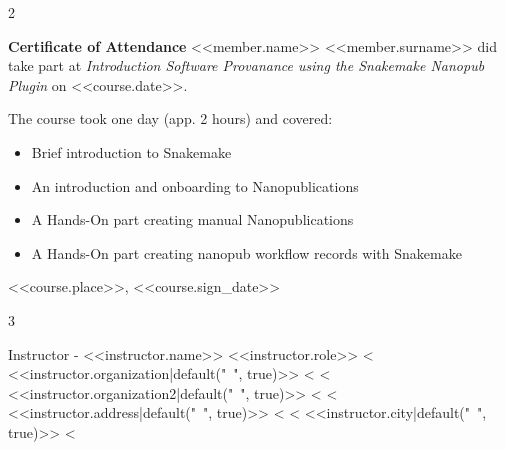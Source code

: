 \documentclass[a4paper,10pt]{article}
\begin{document}
\pagestyle{empty}
\begin{multicols}{2}

 \columnbreak
\end{multicols}


\begin{center}
 \vfill
 \huge{\bf Certificate of Attendance}
 \vfill
 \Large{<<member.name>> <<member.surname>>}
 \vfill
 did take part at 
 \vfill
 \emph{Introduction Software Provanance using the Snakemake Nanopub Plugin}
 \vfill
 on <<course.date>>.
 \vfill
\end{center}

The course took one day (app. 2 hours) and covered:
\begin{itemize}
  \item Brief introduction to Snakemake
  \item An introduction and onboarding to Nanopublications
  \item A Hands-On part creating manual Nanopublications
  \item A Hands-On part creating nanopub workflow records with Snakemake
\end{itemize}

\vfill
<<course.place>>, <<course.sign_date>>

\begin{multicols}{3}
 \begin{minipage}[b][4cm][b]{0.4\textwidth}
   
  
 \end{minipage}%
 \columnbreak
 \begin{minipage}[b][4cm][b]{0.2\textwidth}
 \end{minipage}%
 \columnbreak
 \begin{flushright}
 \raggedleft
 \begin{minipage}[b][4cm][b]{0.4\textwidth}
     Instructor - <<instructor.name>>\newline
     \footnotesize{<<instructor.role>>}\newline
  \phantom{H}
  <%
     <<instructor.organization|default("~", true)>> \newline
  <%
  <%
    <<instructor.organization2|default("~", true)>> \newline
  <%
  <%
     <<instructor.address|default("~", true)>>\newline
  <%
  <%
     <<instructor.city|default("~", true)>>\newline
  <%
 \end{minipage}
 \end{flushright}

\end{multicols}
\end{document}
